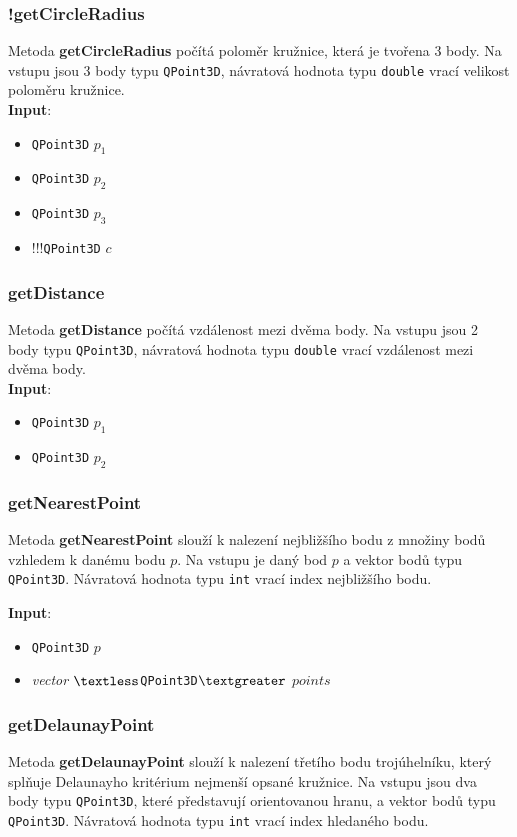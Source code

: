 \documentclass[a4paper, 12pt]{article}
\begin{document}
\subsubsection*{!getCircleRadius}
Metoda \textbf{getCircleRadius} počítá poloměr kružnice, která je tvořena 3 body. Na vstupu jsou 3 body typu \texttt{QPoint3D}, návratová hodnota typu \texttt{double} vrací velikost poloměru kružnice.\\ 

\textbf{Input}:
\begin{itemize}
\item \texttt{QPoint3D} $p_1$ 
\item \texttt{QPoint3D} $p_2$ 
\item \texttt{QPoint3D} $p_3$
\item !!!\texttt{QPoint3D} $c$
\end{itemize}

\subsubsection*{getDistance}
Metoda \textbf{getDistance} počítá vzdálenost mezi dvěma body. Na vstupu jsou 2 body typu \texttt{QPoint3D}, návratová hodnota typu \texttt{double} vrací vzdálenost mezi dvěma body.\\ 

\textbf{Input}:
\begin{itemize}
\item \texttt{QPoint3D} $p_1$ 
\item \texttt{QPoint3D} $p_2$
\end{itemize}

\subsubsection*{getNearestPoint}
Metoda \textbf{getNearestPoint} slouží k nalezení nejbližšího bodu z množiny bodů vzhledem k danému bodu $p$. Na vstupu je daný bod $p$ a vektor bodů typu \texttt{QPoint3D}. Návratová hodnota typu \texttt{int} vrací index nejbližšího bodu.

\textbf{Input}:
\begin{itemize}
\item \texttt{QPoint3D} $p$ 
\item \textsl{vector} $\textless$\texttt{QPoint3D}$\textgreater$ $points$
\end{itemize}

\subsubsection*{getDelaunayPoint}
Metoda \textbf{getDelaunayPoint} slouží k nalezení třetího bodu trojúhelníku, který splňuje Delaunayho kritérium nejmenší opsané kružnice. Na vstupu jsou dva body typu \texttt{QPoint3D}, které představují orientovanou hranu, a vektor bodů typu \texttt{QPoint3D}. Návratová hodnota typu \texttt{int} vrací index hledaného bodu.\\
\end{document}
